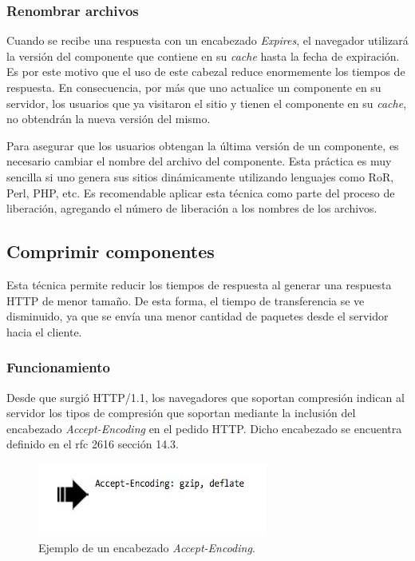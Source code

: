 \subsubsection{Renombrar archivos}

Cuando se recibe una respuesta con un encabezado \emph{Expires}, el navegador utilizará la versión del componente que contiene en su \emph{cache} hasta
la fecha de expiración. Es por este motivo que el uso de este cabezal reduce enormemente los tiempos de respuesta. En consecuencia, por más que uno actualice un componente
en su servidor, los usuarios que ya visitaron el sitio y tienen el componente en su \emph{cache}, no obtendrán la nueva versión del mismo.

Para asegurar que los usuarios obtengan la última versión de un componente, es necesario cambiar el nombre del archivo del componente. Esta práctica es muy
sencilla si uno genera sus sitios dinámicamente utilizando lenguajes como RoR, Perl, PHP, etc. Es recomendable aplicar esta técnica como parte del proceso de liberación,
agregando el número de liberación a los nombres de los archivos.


\subsection{Comprimir componentes}
\label{cap3:reglas:compresion}

Esta técnica permite reducir los tiempos de respuesta al generar una respuesta HTTP de menor tamaño. De esta forma, el tiempo de transferencia se ve disminuido, ya que se envía
una menor cantidad de paquetes desde el servidor hacia el cliente.

\subsubsection{Funcionamiento}

Desde que surgió HTTP/1.1, los navegadores que soportan compresión indican al servidor los tipos de compresión que soportan mediante la inclusión del encabezado
\emph{Accept-Encoding} en el pedido HTTP. Dicho encabezado se encuentra definido en el rfc 2616 \cite{rfc2616} sección 14.3.

\begin{figure}[h!]
\centering
\includegraphics[scale=0.5]{figuras/hpws/accept-encoding.jpg}
  \caption{Ejemplo de un encabezado \emph{Accept-Encoding}.}
    \label{fig.gzip-request}
\end{figure}

